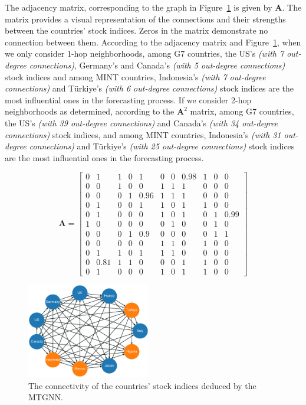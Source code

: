 The adjacency matrix, corresponding to 
the graph in Figure~\ref{fig:graph} is given by \textbf{A}. The matrix provides a visual representation of the connections and their strengths between the countries' stock indices. Zeros in the matrix demonstrate no connection between them. According to the adjacency matrix and Figure~\ref{fig:graph}, when we only consider 1-hop neighborhoods, among G7 countries, the US's \textit{(with 7 out-degree connections)}, Germany's and Canada's \textit{(with 5 out-degree connections)} stock indices and among MINT countries, Indonesia's \textit{(with 7 out-degree connections)} and T\"{u}rkiye's \textit{(with 6 out-degree connections)} stock indices are the most influential ones in the forecasting process. If we consider 2-hop neighborhoods as determined, according to the $\bm{A}^2$ matrix, among G7 countries, the US's \textit{(with 39 out-degree connections)} and Canada's \textit{(with 34 out-degree connections)} stock indices, and among MINT countries, Indonesia's \textit{(with 31 out-degree connections)} and T\"{u}rkiye's \textit{(with 25 out-degree connections)} stock indices are the most influential ones in the forecasting process.

\setcounter{MaxMatrixCols}{11}
%
\small
\begin{equation}
\bm{A} = \begin{bmatrix}
0 & 1 & 1 & 0 & 1 & 0 & 0 & 0.98 & 1 & 0 & 0 \\ 
0 & 0 & 1 & 0 & 0 & 1 & 1 & 1 & 0 & 0 & 0 \\
0 & 0 & 0 & 1 & 0.96 & 1 & 1 & 1 & 0 & 0 & 0 \\
0 & 1 & 0 & 0 & 1 & 1 & 0 & 1 & 1 & 0 & 0 \\
0 & 1 & 0 & 0 & 0 & 1 & 0 & 1 & 0 & 1 & 0.99 \\
1 & 0 & 0 & 0 & 0 & 0 & 1 & 0 & 0 & 1 & 0 \\
0 & 0 & 0 & 1 & 0.9 & 0 & 0 & 0 & 0 & 1 & 1 \\ 
0 & 0 & 0 & 0 & 0 & 1 & 1 & 0 & 1 & 0 & 0 \\
0 & 1 & 1 & 0 & 1 & 1 & 1 & 0 & 0 & 0 & 0 \\
0 & 0.81 & 1 & 1 & 0 & 0 & 0 & 1 & 1 & 0 & 0 \\
0 & 1 & 0 & 0 & 0 & 1 & 0 & 1 & 1 & 0 & 0
\end{bmatrix}
\end{equation}
\normalsize
%
%
\begin{figure}[tbh]
  \centering
  \includegraphics[width=0.48\textwidth]{./figures/graph.eps}
  \caption{The connectivity of the countries' stock indices deduced by the MTGNN.} 
  \label{fig:graph}
\end{figure}


